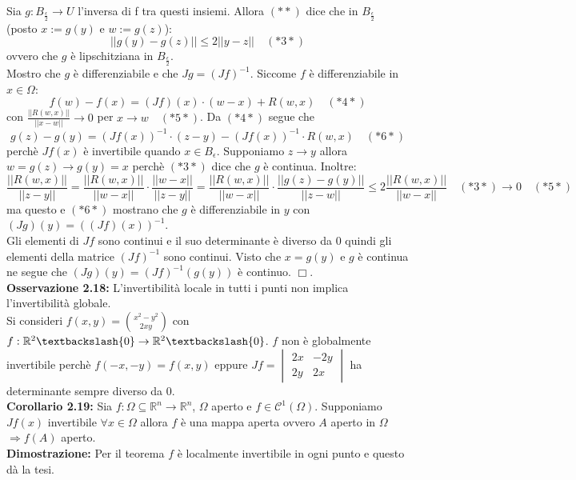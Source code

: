 \documentclass[a4paper,11pt,titlepage]{book}
\begin{document}
Sia $g:B_{\frac{\epsilon}{2}}\to U$ l'inversa di f tra questi insiemi. Allora $(**)$ dice che in $B_{\frac{\epsilon}{2}}$ (posto $x:=g(y)$ e $w:=g(z)$): $$||g(y)-g(z)||\leq 2||y-z||\quad (*3*)$$ ovvero che $g$ è lipschitziana in $B_{\frac{\epsilon}{2}}$.\\

Mostro che $g$ è differenziabile e che $Jg=(Jf)^{-1}$. Siccome $f$ è differenziabile in $x\in\Omega$: $$f(w)-f(x)=(Jf)(x)\cdot(w-x)+R(w,x)\quad(*4*)$$ con $\frac{||R(w,x)||}{||x-w||}\to 0$ per $x\to w\quad(*5*)$. Da $(*4*)$ segue che $$g(z)-g(y)=(Jf(x))^{-1}\cdot (z-y)-(Jf(x))^{-1}\cdot R(w,x)\quad (*6*)$$ perchè $Jf(x)$ è invertibile quando $x\in B_\epsilon$. Supponiamo $z\to y$ allora $w=g(z)\to g(y)=x$ perchè $(*3*)$ dice che $g$ è continua. Inoltre: $$\frac{||R(w,x)||}{||z-y||}=\frac{||R(w,x)||}{||w-x||}\cdot\frac{||w-x||}{||z-y||}=\frac{||R(w,x)||}{||w-x||}\cdot\frac{||g(z)-g(y)||}{||z-w||}\leq 2\frac{||R(w,x)||}{||w-x||}\quad(*3*)\to 0\quad (*5*)$$ ma questo e $(*6*)$ mostrano che $g$ è differenziabile in $y$ con $(Jg)(y)=((Jf)(x))^{-1}$.\\

Gli elementi di $Jf$ sono continui e il suo determinante è diverso da $0$ quindi gli elementi della matrice $(Jf)^{-1}$ sono continui. Visto che $x=g(y)$ e $g$ è continua ne segue che $(Jg)(y)=(Jf)^{-1}(g(y))$ è continuo. $\Box$.\\

\textbf{Osservazione 2.18:} L'invertibilità locale in tutti i punti non implica l'invertibilità globale.\\

Si consideri $f(x,y)=\binom{x^2-y^2}{2xy}$ con $f:\mathbb{R}^2\textbackslash\{0\}\to\mathbb{R}^2\textbackslash\{0\}$. $f$ non è globalmente invertibile perchè $f(-x,-y)=f(x,y)$ eppure $Jf=\begin{vmatrix} 2x & -2y \\ 2y & 2x \end{vmatrix}$ ha determinante sempre diverso da $0$.\\

\textbf{Corollario 2.19:} Sia $f:\Omega\subseteq\mathbb{R}^n\to\mathbb{R}^n$, $\Omega$ aperto e $f\in\mathcal{C}^1(\Omega)$. Supponiamo $Jf(x)$ invertibile $\forall x\in\Omega$ allora $f$ è una mappa aperta ovvero $A$ aperto in $\Omega$ $\Rightarrow f(A)$ aperto.\\

\textbf{Dimostrazione:} Per il teorema $f$ è localmente invertibile in ogni punto e questo dà la tesi.\\
\end{document}
